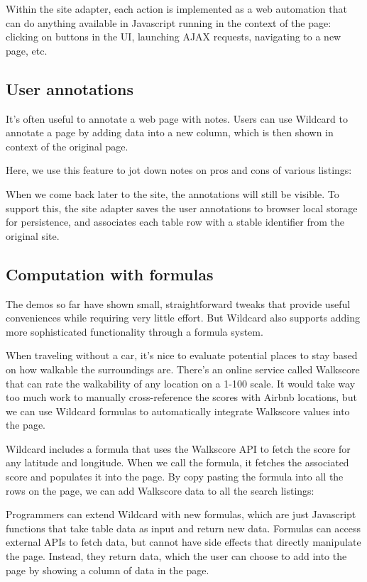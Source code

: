 \documentclass[english,submission]{programming}
\begin{document}
Within the site adapter, each action is implemented as a web automation
that can do anything available in Javascript running in the context of
the page: clicking on buttons in the UI, launching AJAX requests,
navigating to a new page, etc.

\hypertarget{user-annotations}{%
\subsection{User annotations}\label{user-annotations}}

It's often useful to annotate a web page with notes. Users can use
Wildcard to annotate a page by adding data into a new column, which is
then shown in context of the original page.

Here, we use this feature to jot down notes on pros and cons of various
listings:

When we come back later to the site, the annotations will still be
visible. To support this, the site adapter saves the user annotations to
browser local storage for persistence, and associates each table row
with a stable identifier from the original site.

\hypertarget{computation-with-formulas}{%
\subsection{Computation with formulas}\label{computation-with-formulas}}

The demos so far have shown small, straightforward tweaks that provide
useful conveniences while requiring very little effort. But Wildcard
also supports adding more sophisticated functionality through a formula
system.

When traveling without a car, it's nice to evaluate potential places to
stay based on how walkable the surroundings are. There's an online
service called Walkscore that can rate the walkability of any location
on a 1-100 scale. It would take way too much work to manually
cross-reference the scores with Airbnb locations, but we can use
Wildcard formulas to automatically integrate Walkscore values into the
page.

Wildcard includes a formula that uses the Walkscore API to fetch the
score for any latitude and longitude. When we call the formula, it
fetches the associated score and populates it into the page. By copy
pasting the formula into all the rows on the page, we can add Walkscore
data to all the search listings:

Programmers can extend Wildcard with new formulas, which are just
Javascript functions that take table data as input and return new data.
Formulas can access external APIs to fetch data, but cannot have side
effects that directly manipulate the page. Instead, they return data,
which the user can choose to add into the page by showing a column of
data in the page.
\end{document}
